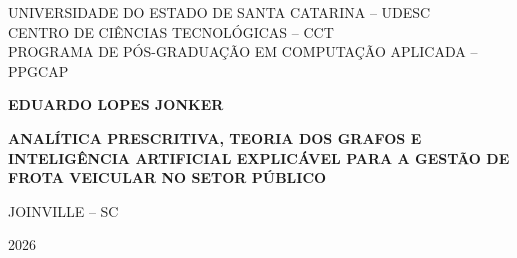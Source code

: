 \begin{capa}
    \center
    {\ABNTEXchapterfont\large UNIVERSIDADE DO ESTADO DE SANTA CATARINA -- UDESC\\CENTRO DE CIÊNCIAS TECNOLÓGICAS -- CCT\\PROGRAMA DE PÓS-GRADUAÇÃO EM COMPUTAÇÃO APLICADA -- PPGCAP\par}
    
    \vspace{4.5cm}
    {\ABNTEXchapterfont\bfseries\large EDUARDO LOPES JONKER\par}
    
    \vspace{4.5cm}
    \begin{center}
        {\ABNTEXchapterfont\bfseries\Large ANALÍTICA PRESCRITIVA, TEORIA DOS GRAFOS E INTELIGÊNCIA ARTIFICIAL EXPLICÁVEL PARA A GESTÃO DE FROTA VEICULAR NO SETOR PÚBLICO\par}
    \end{center}
    
    \vfill
    {\large JOINVILLE -- SC\par}
    {\large 2026\par}
\end{capa}
